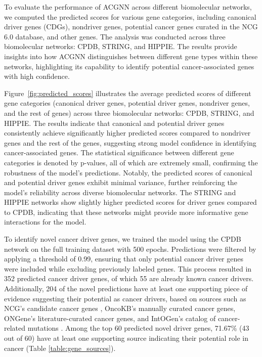   \noindent To evaluate the performance of ACGNN across different biomolecular networks, we computed the predicted scores for various gene categories, including canonical driver genes (CDGs), nondriver genes, potential cancer genes curated in the NCG 6.0 database, and other genes. The analysis was conducted across three biomolecular networks: CPDB, STRING, and HIPPIE. The results provide insights into how ACGNN distinguishes between different gene types within these networks, highlighting its capability to identify potential cancer-associated genes with high confidence.
 
  \noindent Figure~\ref{fig:predicted_scores} illustrates the average predicted scores of different gene categories (canonical driver genes, potential driver genes, nondriver genes, and the rest of genes) across three biomolecular networks: CPDB, STRING, and HIPPIE. The results indicate that canonical and potential driver genes consistently achieve significantly higher predicted scores compared to nondriver genes and the rest of the genes, suggesting strong model confidence in identifying cancer-associated genes. The statistical significance between different gene categories is denoted by p-values, all of which are extremely small, confirming the robustness of the model's predictions. Notably, the predicted scores of canonical and potential driver genes exhibit minimal variance, further reinforcing the model’s reliability across diverse biomolecular networks. The STRING and HIPPIE networks show slightly higher predicted scores for driver genes compared to CPDB, indicating that these networks might provide more informative gene interactions for the model.
  
To identify novel cancer driver genes, we trained the model using the CPDB network on the full training dataset with 500 epochs. Predictions were filtered by applying a threshold of 0.99, ensuring that only potential cancer driver genes were included while excluding previously labeled genes. This process resulted in 352 predicted cancer driver genes, of which 55 are already known cancer drivers. Additionally, 204 of the novel predictions have at least one supporting piece of evidence suggesting their potential as cancer drivers, based on sources such as NCG’s candidate cancer genes \cite{Repana2019}, OncoKB’s manually curated cancer genes, ONGene’s literature-curated cancer genes, and IntOGen's catalog of cancer-related mutations \cite{martinez2020compendium}. Among the top 60 predicted novel driver genes, 71.67\% (43 out of 60) have at least one supporting source indicating their potential role in cancer (Table \ref{table:gene_sources}).
 
